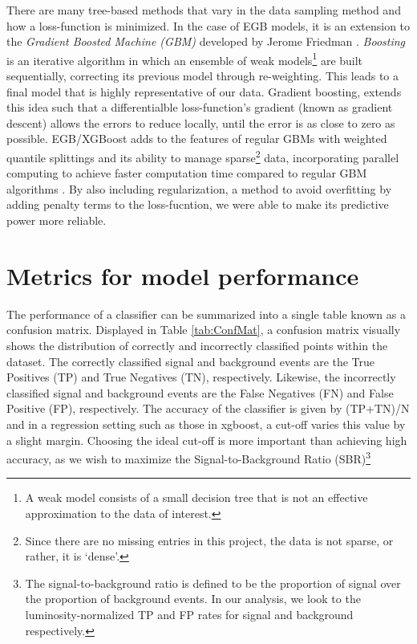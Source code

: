 There are many tree-based methods that vary in the data sampling method and how a loss-function is minimized. In the case of EGB models, it is an extension to the \textit{Gradient Boosted Machine (GBM)} developed by Jerome Friedman \cite{friedman2001greedy}. \textit{Boosting} is an iterative algorithm in which an ensemble of weak models\footnote{A weak model consists of a small decision tree that is not an effective approximation to the data of interest.} are built sequentially, correcting its previous model through re-weighting. This leads to a final model that is highly representative of our data. Gradient boosting, extends this idea such that a differentialble loss-function's gradient (known as gradient descent) allows the errors to reduce locally, until the error is as close to zero as possible. EGB/XGBoost adds to the features of regular GBMs with weighted quantile splittings and its ability to manage sparse\footnote{Since there are no missing entries in this project, the data is not sparse, or rather, it is `dense'.} data, incorporating parallel computing to achieve faster computation time compared to regular GBM algorithms \cite{chen2016xgboost}. By also including regularization, a method to avoid overfitting by adding penalty terms to the loss-fucntion, we were able to make its predictive power more reliable. \\
\section{Metrics for model performance}
\label{sec:metrics}
The performance of a classifier can be summarized into a single table known as a confusion matrix. Displayed in Table \ref{tab:ConfMat}, a confusion matrix visually shows the distribution of correctly and incorrectly classified points within the dataset. The correctly classified signal and background events are the True Positives (TP) and True Negatives (TN), respectively. Likewise, the incorrectly classified signal and background events are the False Negatives (FN) and False Positive (FP), respectively. The accuracy of the classifier is given by (TP+TN)/N and in a regression setting such as those in xgboost, a cut-off varies this value by a slight margin. Choosing the ideal cut-off is more important than achieving high accuracy, as we wish to maximize the Signal-to-Background Ratio (SBR)\footnote{The signal-to-background ratio is defined to be the proportion of signal over the proportion of background events. In our analysis, we look to the luminosity-normalized TP and FP rates for signal and background respectively.}\\

